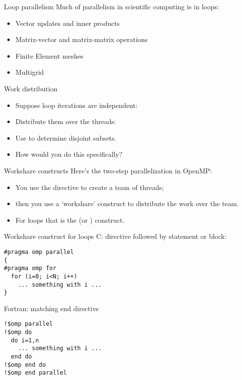 
\begin{frame}{Loop parallelism}
  Much of parallelism in scientific computing is in loops:
  \begin{itemize}
  \item Vector updates and inner products
  \item Matrix-vector and matrix-matrix operations
  \item Finite Element meshes
  \item Multigrid
  \end{itemize}
\end{frame}

\begin{frame}[containsverbatim]{Work distribution}
  \begin{itemize}
  \item Suppose loop iterations are independent:
  \item Distribute them over the threads:
  \item Use  to determine disjoint subsets.
  \item How would you do this specifically?
  \end{itemize}
\end{frame}

\begin{frame}[containsverbatim]{Workshare constructs}
  Here's the two-step parallelization in OpenMP:
  \begin{itemize}
  \item You use the  directive to create a team of
    threads;
  \item then you use a `workshare' construct to distribute the
    work over the team.
  \item For loops that is the  (or ) construct.
  \end{itemize}
\end{frame}

\begin{frame}[containsverbatim]{Workshare construct for loops}
C: directive followed by statement or block:
\begin{verbatim}
#pragma omp parallel
{
#pragma omp for
  for (i=0; i<N; i++)
    ... something with i ...
}
\end{verbatim}
Fortran: matching end directive
\begin{verbatim}
!$omp parallel
!$omp do
  do i=1,n
    ... something with i ...
  end do
!$omp end do
!$omp end parallel
\end{verbatim}
\end{frame}


